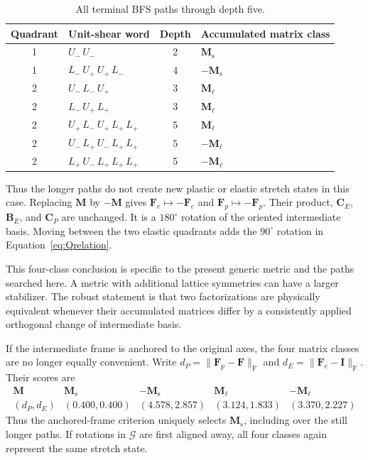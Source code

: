 \documentclass[11pt]{article}
\newcommand{\shortp}{\mathrm{s}}
\newcommand{\longp}{\ell}
\newcommand{\Frob}{\mathrm{F}}
\newcommand{\Uminus}{U_{-}}
\newcommand{\Lminus}{L_{-}}
\newcommand{\Lplus}{L_{+}}
\newcommand{\Uplus}{U_{+}}
\begin{document}
\begin{table}[htbp]
\centering
\caption{All terminal BFS paths through depth five.}
\label{tab:paths}
\small
\renewcommand{\arraystretch}{1.18}
\begin{tabularx}{0.88\textwidth}{@{}c l c X@{}}
\toprule
Quadrant & Unit-shear word & Depth & Accumulated matrix class \\
\midrule
1 & $\Uminus\,\Uminus$ & 2 & $\mathbf M_{\shortp}$ \\
1 & $\Lminus\,\Uplus\,\Uplus\,\Lminus$ & 4 & $-\mathbf M_{\shortp}$ \\
2 & $\Uminus\,\Lminus\,\Uplus$ & 3 & $\mathbf M_{\longp}$ \\
2 & $\Lminus\,\Uplus\,\Lplus$ & 3 & $\mathbf M_{\longp}$ \\
2 & $\Uplus\,\Lminus\,\Uplus\,\Lplus\,\Lplus$ & 5 & $\mathbf M_{\longp}$ \\
2 & $\Uminus\,\Lplus\,\Uminus\,\Lplus\,\Lplus$ & 5 & $-\mathbf M_{\longp}$ \\
2 & $\Lplus\,\Uminus\,\Lplus\,\Lplus\,\Lplus$ & 5 & $-\mathbf M_{\longp}$ \\
\bottomrule
\end{tabularx}
\end{table}

Thus the longer paths do not create new plastic or elastic stretch states in
this case.  Replacing \(\mathbf M\) by \(-\mathbf M\) gives
\(\mathbf F_e\mapsto-\mathbf F_e\) and
\(\mathbf F_p\mapsto-\mathbf F_p\).  Their product, \(\mathbf C_E\),
\(\mathbf B_E\), and \(\mathbf C_P\) are unchanged.  It is a $180^\circ$
rotation of the oriented intermediate basis.  Moving between the two elastic
quadrants adds the $90^\circ$ rotation in Equation~\eqref{eq:Qrelation}.

This four-class conclusion is specific to the present generic metric and the
paths searched here.  A metric with additional lattice symmetries can have a
larger stabilizer.  The robust statement is that two factorizations are
physically equivalent whenever their accumulated matrices differ by a
consistently applied orthogonal change of intermediate basis.

If the intermediate frame is anchored to the original axes, the four matrix
classes are no longer equally convenient.  Write
\(d_P=\lVert\mathbf F_p-\mathbf F\rVert_{\Frob}\) and
\(d_E=\lVert\mathbf F_e-\mathbf I\rVert_{\Frob}\).  Their scores are
\begin{equation}
 \begin{array}{c|cccc}
 \mathbf M & \mathbf M_{\shortp} & -\mathbf M_{\shortp}
 & \mathbf M_{\longp} & -\mathbf M_{\longp} \\ \hline
 (d_P,d_E) & (0.400,0.400) & (4.578,2.857)
 & (3.124,1.833) & (3.370,2.227)
 \end{array}
 \label{eq:fourclassscores}
\end{equation}
Thus the anchored-frame criterion uniquely selects
\(\mathbf M_{\shortp}\), including over the still longer paths.  If rotations
in \(\mathcal G\) are first aligned away, all four classes again represent the
same stretch state.
\end{document}
